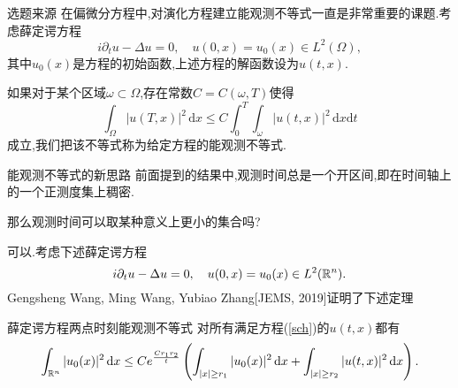 

\begin{frame}[t]{选题来源}
  在偏微分方程中,对演化方程建立能观测不等式一直是非常重要的课题.考虑薛定谔方程
  \begin{equation}
    i\partial_t u-\Delta u=0,\quad u(0,x)=u_0(x)\in L^2(\Omega),
  \end{equation}
  其中$u_0(x)$是方程的初始函数,上述方程的解函数设为$u(t,x)$.
  
  如果对于某个区域$\omega \subset \Omega$,存在常数$C=C(\omega,T)$使得
  \begin{equation}
    \int_{\Omega}|u(T,x)|^2\,\mathrm{d}x\le C \int_0^T\int_{\omega}|u(t,x)|^2\,\mathrm{d}x\mathrm{d}t\label{obs}
  \end{equation}
  成立,我们把该不等式称为给定方程的能观测不等式.
\end{frame}

\iffalse\begin{frame}[t]
  考虑薛定谔方程 
  \begin{equation}\label{sch}
    i\partial_t u -\Delta u=0,\quad u(0,x)=u_0(x)\in L^2(\R^{n}).
  \end{equation}
 能观测不等式是指下述形式的不等式
 \begin{equation}
   \int_{\Omega}|u(T,x)|^2\,\mathrm{d}x\le C(T,\Omega)\int_{0}^{T}\int_{\omega}|u(t,x)|^2\,\mathrm{d}x\mathrm{d}t,
 \end{equation}
 这里$\omega\subset \Omega$.
 \begin{itemize}
   \item Rosier-Zhang[JDE,2009]证明了全空间情形下有界区域外的可观测性, 即$\omega$ 可取为任意半径的球外.
   \item Jaffard[PM,1990], Komornik-Loreti[2005]证明周期边界条件下任意开集上的可观测性,即$\omega$ 可取为任意开集.
 \end{itemize}
\end{frame}
\fi



\begin{frame}[t]{能观测不等式的新思路}
  前面提到的结果中,观测时间总是一个开区间,即在时间轴上的一个正测度集上稠密.
  
  那么观测时间可以取某种意义上更小的集合吗?

  可以.考虑下述薛定谔方程
  \begin{equation}
    i\partial_t u-\Delta u=0,\quad u(0,x)=u_0(x)\in L^2(\mathbb{R}^n).\label{sch}
  \end{equation}
Gengsheng Wang, Ming Wang, Yubiao Zhang[JEMS, 2019]证明了下述定理
  \begin{alertblock}{薛定谔方程两点时刻能观测不等式} 
    对所有满足方程(\ref{sch})的$u(t,x)$都有
  \begin{equation}\label{obsch}
    \int_{\mathbb{R}^{n}}|u_0(x)|^2\,\mathrm{d}x\le Ce^{\frac{Cr_1 r_2}{t}}\left( \int_{|x|\ge r_1}|u_0(x)|^2\,\mathrm{d}x+\int_{|x|\ge r_2}|u(t,x)|^2 \,\mathrm{d}x \right).
  \end{equation}
  \end{alertblock}
\end{frame}

